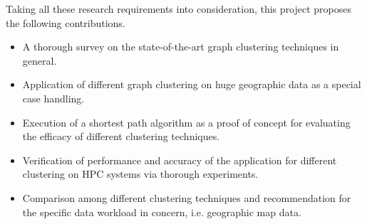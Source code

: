 Taking all these research requirements into consideration, this project proposes the following contributions.
\begin{itemize}
	\item A thorough survey on the state-of-the-art graph clustering techniques in general.
	\item Application of different graph clustering on huge geographic data as a special case handling.
	\item Execution of a shortest path algorithm as a proof of concept for evaluating the efficacy of different clustering techniques.
	\item Verification of performance and accuracy of the application for different clustering on HPC systems via thorough experiments.
	\item Comparison among different clustering techniques and recommendation for the specific data workload in concern, i.e. geographic map data.
\end{itemize}
